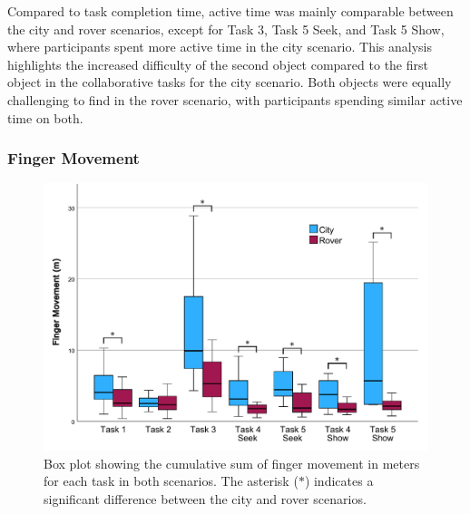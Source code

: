             Compared to task completion time, active time was mainly comparable between the city and rover scenarios, except for Task 3, Task 5 Seek, and Task 5 Show, where participants spent more active time in the city scenario. This analysis highlights the increased difficulty of the second object compared to the first object in the collaborative tasks for the city scenario. Both objects were equally challenging to find in the rover scenario, with participants spending similar active time on both.

        \subsubsection{Finger Movement}


            \begin{figure}[h!]
                \centering
                \includegraphics[width=1\linewidth]{figures/finger_movement_graph.pdf}
                \caption{Box plot showing the cumulative sum of finger movement in meters for each task in both scenarios. The asterisk ($\ast$) indicates a significant difference between the city and rover scenarios.}
                \label{fig:finger_movement}
            \end{figure}

